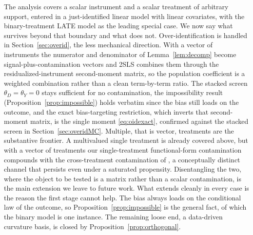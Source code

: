 \documentclass[preprint,11pt,authoryear]{elsarticle}
\theoremstyle{definition}
\begin{document}
The analysis covers a scalar instrument and a scalar treatment of arbitrary support,
entered in a just-identified linear model with linear covariates, with the
binary-treatment LATE model as the leading special case. We now say what survives
beyond that boundary and what does not. Over-identification is handled in
Section~\ref{sec:overid}, the less mechanical direction. With a vector of instruments the
numerator and denominator of Lemma~\ref{lem:decomp} become signal-plus-contamination
vectors and 2SLS combines them through the residualized-instrument second-moment matrix, so
the population coefficient is a weighted combination rather than a clean term-by-term ratio.
The stacked screen $\theta_D=\theta_Y=0$ stays sufficient for no contamination, the
impossibility result (Proposition~\ref{prop:impossible}) holds verbatim since the bias
still loads on the outcome, and the exact bias-targeting restriction, which inverts that
second-moment matrix, is the single moment \eqref{eq:oidexact}, confirmed against the
stacked screen in Section~\ref{sec:overidMC}. Multiple, that is vector,
treatments are the substantive frontier. A multivalued single treatment is already
covered above, but with a vector of treatments our single-treatment functional-form
contamination compounds with the cross-treatment contamination of
\citet{goldsmith2024}, a conceptually distinct channel that persists even under a
saturated propensity. Disentangling the two, where the object to be tested is a matrix
rather than a scalar contamination, is the main extension we leave to future work. What
extends cleanly in every case is the reason the first stage cannot help. The bias always
loads on the conditional law of the outcome, so Proposition~\ref{prop:impossible} is the
general fact, of which the binary model is one instance. The remaining loose end, a
data-driven curvature basis, is closed by Proposition~\ref{prop:orthogonal}.
\end{document}
